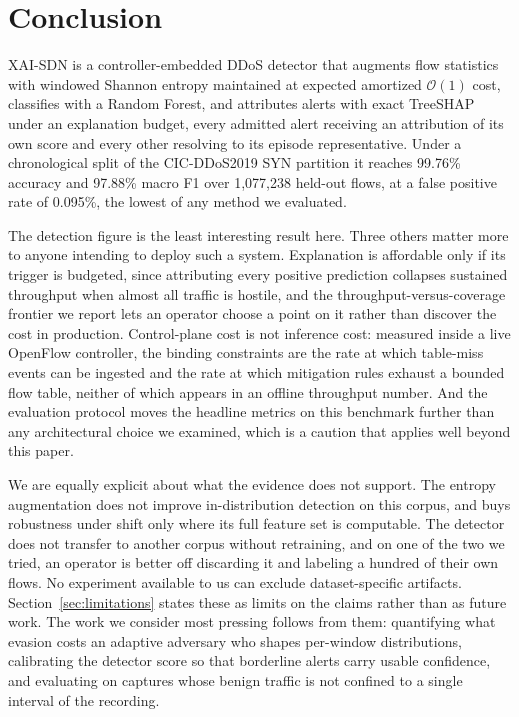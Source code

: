 \documentclass{ieeeaccess}
\begin{document}
\section{Conclusion}
\label{sec:conclusion}

XAI-SDN is a controller-embedded DDoS detector that augments flow statistics with
windowed Shannon entropy maintained at expected amortized $\mathcal{O}(1)$ cost,
classifies with a Random Forest, and attributes alerts with exact TreeSHAP under
an explanation budget, every admitted alert receiving an attribution of its own
score and every other resolving to its episode representative. Under
a chronological split of the CIC-DDoS2019 SYN partition it reaches 99.76\%
accuracy and 97.88\% macro F1 over 1,077,238 held-out flows, at a false positive
rate of 0.095\%, the lowest of any method we evaluated.

The detection figure is the least interesting result here. Three others matter
more to anyone intending to deploy such a system. Explanation is affordable only
if its trigger is budgeted, since attributing every positive prediction collapses
sustained throughput when almost all traffic is hostile, and the
throughput-versus-coverage frontier we report lets an operator choose a point on
it rather than discover the cost in production. Control-plane cost is not
inference cost: measured inside a live OpenFlow controller, the binding
constraints are the rate at which table-miss events can be ingested and the rate
at which mitigation rules exhaust a bounded flow table, neither of which appears
in an offline throughput number. And the evaluation protocol moves the headline
metrics on this benchmark further than any architectural choice we examined,
which is a caution that applies well beyond this paper.

We are equally explicit about what the evidence does not support. The entropy
augmentation does not improve in-distribution detection on this corpus, and buys
robustness under shift only where its full feature set is computable. The
detector does not transfer to another corpus without retraining, and on one of
the two we tried, an operator is better off discarding it and labeling a hundred
of their own flows. No experiment available to us can exclude dataset-specific
artifacts.
Section~\ref{sec:limitations} states these as limits on the claims rather than as
future work. The work we consider most pressing follows from them: quantifying
what evasion costs an adaptive adversary who shapes per-window distributions,
calibrating the detector score so that borderline alerts carry usable confidence,
and evaluating on captures whose benign traffic is not confined to a single
interval of the recording.
\end{document}
